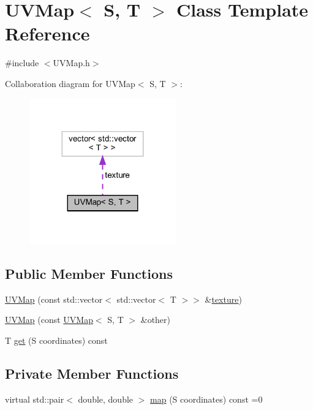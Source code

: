 \hypertarget{classUVMap}{}\section{U\+V\+Map$<$ S, T $>$ Class Template Reference}
\label{classUVMap}


{\ttfamily \#include $<$U\+V\+Map.\+h$>$}



Collaboration diagram for U\+V\+Map$<$ S, T $>$\+:
\nopagebreak
\begin{figure}[H]
\begin{center}
\leavevmode
\includegraphics[width=179pt]{classUVMap__coll__graph}
\end{center}
\end{figure}
\subsection*{Public Member Functions}
\begin{DoxyCompactItemize}
\item 
\mbox{\hyperlink{classUVMap_adc63ebfe75c0e4e3a1dfe47a4c0679f4}{U\+V\+Map}} (const std\+::vector$<$ std\+::vector$<$ T $>$$>$ \&\mbox{\hyperlink{classUVMap_a6804b05501ac1221dd2e20eb43c83637}{texture}})
\item 
\mbox{\hyperlink{classUVMap_a0787e9239f59e850e4c3825d1985d8f3}{U\+V\+Map}} (const \mbox{\hyperlink{classUVMap}{U\+V\+Map}}$<$ S, T $>$ \&other)
\item 
T \mbox{\hyperlink{classUVMap_af06c0d2370a18f2a755dfdfdf71021ad}{get}} (S coordinates) const
\end{DoxyCompactItemize}
\subsection*{Private Member Functions}
\begin{DoxyCompactItemize}
\item 
virtual std\+::pair$<$ double, double $>$ \mbox{\hyperlink{classUVMap_a7e69b96af78122ae897b52f48c13f23e}{map}} (S coordinates) const =0
\end{DoxyCompactItemize}
